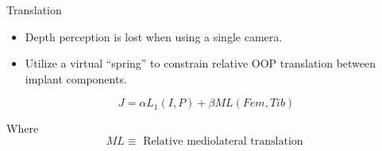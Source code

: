 \documentclass[presentation, aspectratio=1610]{beamer}
\begin{document}
\begin{frame}[label={sec:org2427f54}]{Translation}
\begin{itemize}
\item Depth perception is lost when using a single camera.
\item Utilize a virtual ``spring'' to constrain relative OOP translation between implant components.
\end{itemize}

\begin{equation*}
  J = \alpha L_{1}(I,P) + \beta ML(Fem,Tib)
\end{equation*}

Where
\begin{equation*}
  ML \equiv \text{ Relative mediolateral translation }
\end{equation*}
\end{frame}
\end{document}
